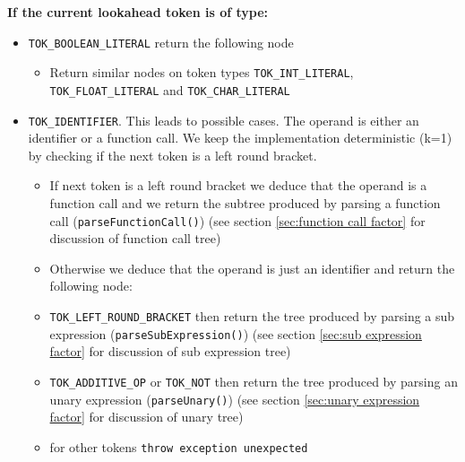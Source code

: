 \textbf{If the current lookahead token is of type:}
\begin{itemize}
	\item  \verb!TOK_BOOLEAN_LITERAL! return the following node
	      \begin{center}
	      \end{center}
	      \begin{itemize}
	      	\item Return similar nodes on token types \verb!TOK_INT_LITERAL!, \verb!TOK_FLOAT_LITERAL! and \verb!TOK_CHAR_LITERAL!
	      \end{itemize}
	\item \verb!TOK_IDENTIFIER!. This leads to possible cases. The operand is either an identifier or a function call. We keep the implementation deterministic (k=1) by checking if the next token is a left round bracket.
	      \begin{itemize}
	      	\item If next token is a left round bracket we deduce that the operand is a function call and we return the subtree produced by parsing a function call (\verb!parseFunctionCall()!) (see section \ref{sec:function call factor} for discussion of function call tree)
	      	\item Otherwise we deduce that the operand is just an identifier and return the following node:
	      	      \begin{center}
	      	      \end{center}
	      	\item \verb!TOK_LEFT_ROUND_BRACKET! then return the tree produced by parsing a sub expression (\verb!parseSubExpression()!) (see section \ref{sec:sub expression factor} for discussion of sub expression tree)
	      	\item \verb!TOK_ADDITIVE_OP! or \verb!TOK_NOT! then return the tree produced by parsing an unary expression (\verb!parseUnary()!) (see section \ref{sec:unary expression factor} for discussion of unary tree)
	      	\item for other tokens \verb!throw exception unexpected!
	      \end{itemize}
\end{itemize}



